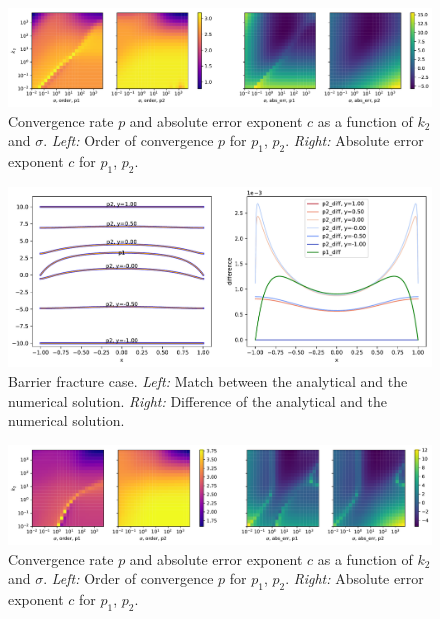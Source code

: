 \documentclass[a4paper,10pt]{article}
\begin{document}
\begin{figure}
  \label{fig:cont_rate}
  \centering
  \includegraphics[width=\textwidth]{./continuous_conv_rate.pdf}
  \caption{Convergence rate $p$ and absolute error exponent $c$ as a function of $k_2$ and $\sigma$. 
  {\it Left:} Order of convergence $p$ for $p_1$, $p_2$.
  {\it Right:} Absolute error exponent $c$ for $p_1$, $p_2$.}
\end{figure}


\begin{figure}
  \label{fig:barrier_solution}
  \centering
  \includegraphics[width=\textwidth, keepaspectratio=true]{./barrier_solution.pdf}
  \caption{Barrier fracture case.
  {\it Left:} Match between the analytical and the numerical solution. 
  {\it Right:} Difference of the analytical and the numerical solution.}
\end{figure}

\begin{figure}
  \label{fig:barrier_rate}
  \centering
  \includegraphics[width=\textwidth]{./barrier_conv_rate.pdf}
  \caption{Convergence rate $p$ and absolute error exponent $c$ as a function of $k_2$ and $\sigma$. 
  {\it Left:} Order of convergence $p$ for $p_1$, $p_2$.
  {\it Right:} Absolute error exponent $c$ for $p_1$, $p_2$.}
\end{figure}
\end{document}
